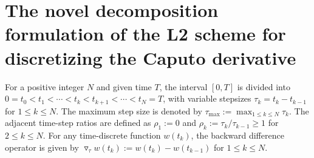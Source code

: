 \documentclass{siamart171218}
\theoremstyle{remark}
\theoremstyle{example}
\numberwithin{equation}{section}
\begin{document}



\section{The novel decomposition formulation of the L2 scheme for discretizing the Caputo derivative}
\label{sec: The discrete Caputo derivative}
For a positive integer $N$ and given time $T$, the interval $[0, T]$ is divided into $0 = t_0 < t_1 < \cdots < t_k < t_{k+1} < \cdots < t_N = T$, with variable stepsizes $\tau_k = t_k - t_{k-1}$ for $1 \leq k \leq N$. The maximum step size is denoted by $\tau_{\max} := \max_{1 \leq k \leq N} \tau_k$.
The adjacent time-step ratios are defined as $\rho_1 := 0$ and $\rho_k := \tau_k / \tau_{k-1} \geq 1$ for $2 \leq k \leq N$. For any time-discrete function $w(t_k)$, the backward difference operator is given by $\triangledown_\tau w(t_k) := w(t_k) - w(t_{k-1})$ for $1 \leq k \leq N$.
\end{document}
